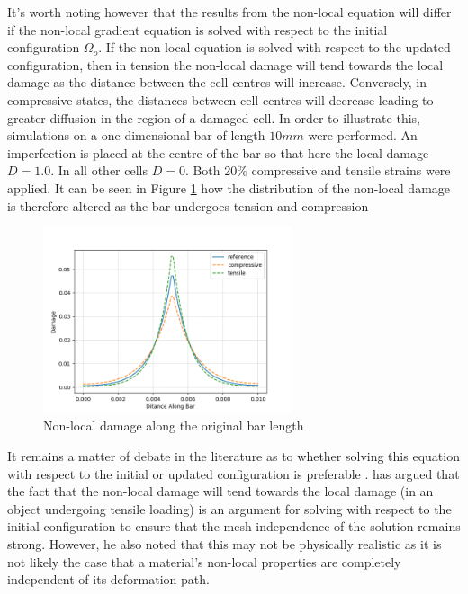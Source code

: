 \documentclass[sn-mathphys,Numbered,draft]{sn-jnl}%
\begin{document}
\begin{appendices}
It's worth noting however that the results from the non-local equation will differ if the non-local gradient equation is solved with respect to the initial configuration $\Omega_o$. If the non-local equation is solved with respect to the updated configuration, then in tension the non-local damage will tend towards the local damage as the distance between the cell centres will increase. Conversely, in compressive states, the distances between cell centres will decrease leading to greater diffusion in the region of a damaged cell. In order to illustrate this, simulations on a one-dimensional bar of length $10mm$ were performed. An imperfection is placed at the centre of the bar so that here the local damage $D=1.0$. In all other cells $D=0$. Both 20\% compressive and tensile strains were applied. It can be seen in Figure \ref{fig:compressiveTensileNonLocalDamage} how the distribution of the non-local damage is therefore altered as the bar undergoes tension and compression 

\begin{figure}[htb]
\begin{center}
	\includegraphics[width=0.65\textwidth]{./Figures/damageModels/compressiveTensileDamage.png}
\caption{Non-local damage along the original bar length}
\label{fig:compressiveTensileNonLocalDamage}
\end{center}
\end{figure}

It remains a matter of debate in the literature as to whether solving this equation with respect to the initial or updated configuration is preferable \cite{geers_strongly_2003}. \citet{steinmann_formulation_nodate} has argued that the fact that the non-local damage will tend towards the local damage (in an object undergoing tensile loading) is an argument for solving with respect to the initial configuration to ensure that the mesh independence of the solution remains strong. However, he also noted that this may not be physically realistic as it is not likely the case that a material's non-local properties are completely independent of its deformation path.


\end{appendices}
\end{document}
